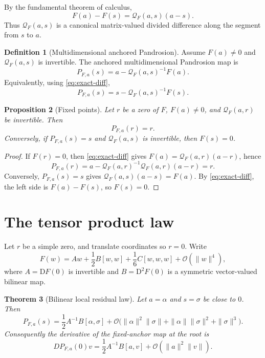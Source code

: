 \documentclass[11pt]{article}
\newtheorem{theorem}{Theorem}[section]
\newtheorem{proposition}[theorem]{Proposition}
\theoremstyle{definition}
\newtheorem{definition}[theorem]{Definition}
\newcommand{\D}{\mathrm D}
\newcommand{\Q}{\mathcal Q}
\newcommand{\Oterm}{\mathcal O}
\begin{document}
By the fundamental theorem of calculus,
\begin{equation}\label{eq:exact-diff}
F(a)-F(s)=\Q_F(a,s)(a-s).
\end{equation}
Thus $\Q_F(a,s)$ is a canonical matrix-valued divided difference along the segment from $s$ to $a$.

\begin{definition}[Multidimensional anchored Pandrosion]
Assume $F(a)\neq0$ and $\Q_F(a,s)$ is invertible. The anchored multidimensional Pandrosion map is
\begin{equation}\label{eq:Pmulti}
P_{F,a}(s)=a-\Q_F(a,s)^{-1}F(a).
\end{equation}
Equivalently, using \eqref{eq:exact-diff},
\begin{equation}\label{eq:secant-form}
P_{F,a}(s)=s-\Q_F(a,s)^{-1}F(s).
\end{equation}
\end{definition}

\begin{proposition}[Fixed points]\label{prop:fixed}
Let $r$ be a zero of $F$, $F(a)\neq0$, and $\Q_F(a,r)$ be invertible. Then
\[
P_{F,a}(r)=r.
\]
Conversely, if $P_{F,a}(s)=s$ and $\Q_F(a,s)$ is invertible, then $F(s)=0$.
\end{proposition}

\begin{proof}
If $F(r)=0$, then \eqref{eq:exact-diff} gives $F(a)=\Q_F(a,r)(a-r)$, hence
\[
P_{F,a}(r)=a-\Q_F(a,r)^{-1}\Q_F(a,r)(a-r)=r.
\]
Conversely, $P_{F,a}(s)=s$ gives $\Q_F(a,s)(a-s)=F(a)$. By \eqref{eq:exact-diff}, the left side is $F(a)-F(s)$, so $F(s)=0$.
\end{proof}

\section{The tensor product law}

Let $r$ be a simple zero, and translate coordinates so $r=0$. Write
\[
F(w)=Aw+\frac12 B[w,w]+\frac16 C[w,w,w]+\Oterm(\|w\|^4),
\]
where $A=\D F(0)$ is invertible and $B=\D^2F(0)$ is a symmetric vector-valued bilinear map.

\begin{theorem}[Bilinear local residual law]\label{thm:bilinear}
Let $a=\alpha$ and $s=\sigma$ be close to $0$. Then
\begin{equation}\label{eq:bilinear-law}
P_{F,a}(s)
=
\frac12 A^{-1}B[\alpha,\sigma]
+
\Oterm\big(\|\alpha\|^2\|\sigma\|+\|\alpha\|\|\sigma\|^2+\|\sigma\|^3\big).
\end{equation}
Consequently the derivative of the fixed-anchor map at the root is
\begin{equation}\label{eq:multimult}
DP_{F,a}(0)v
=
\frac12 A^{-1}B[a,v]
+
\Oterm(\|a\|^2\|v\|).
\end{equation}
\end{theorem}
\end{document}
